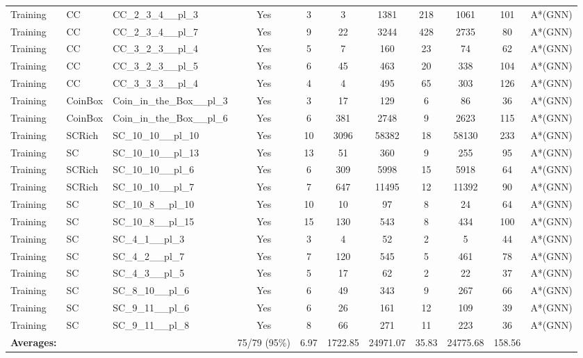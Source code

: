 \documentclass{article}
\begin{document}
\begin{tabular}{lllcccccccc}
Training & CC & CC\_2\_3\_4\_\_pl\_3 & Yes & 3 & 3 & 1381 & 218 & 1061 & 101 & A*(GNN) \\
Training & CC & CC\_2\_3\_4\_\_pl\_7 & Yes & 9 & 22 & 3244 & 428 & 2735 & 80 & A*(GNN) \\
Training & CC & CC\_3\_2\_3\_\_pl\_4 & Yes & 5 & 7 & 160 & 23 & 74 & 62 & A*(GNN) \\
Training & CC & CC\_3\_2\_3\_\_pl\_5 & Yes & 6 & 45 & 463 & 20 & 338 & 104 & A*(GNN) \\
Training & CC & CC\_3\_3\_3\_\_pl\_4 & Yes & 4 & 4 & 495 & 65 & 303 & 126 & A*(GNN) \\
Training & CoinBox & Coin\_in\_the\_Box\_\_pl\_3 & Yes & 3 & 17 & 129 & 6 & 86 & 36 & A*(GNN) \\
Training & CoinBox & Coin\_in\_the\_Box\_\_pl\_6 & Yes & 6 & 381 & 2748 & 9 & 2623 & 115 & A*(GNN) \\
Training & SCRich & SC\_10\_10\_\_pl\_10 & Yes & 10 & 3096 & 58382 & 18 & 58130 & 233 & A*(GNN) \\
Training & SC & SC\_10\_10\_\_pl\_13 & Yes & 13 & 51 & 360 & 9 & 255 & 95 & A*(GNN) \\
Training & SCRich & SC\_10\_10\_\_pl\_6 & Yes & 6 & 309 & 5998 & 15 & 5918 & 64 & A*(GNN) \\
Training & SCRich & SC\_10\_10\_\_pl\_7 & Yes & 7 & 647 & 11495 & 12 & 11392 & 90 & A*(GNN) \\
Training & SC & SC\_10\_8\_\_pl\_10 & Yes & 10 & 10 & 97 & 8 & 24 & 64 & A*(GNN) \\
Training & SC & SC\_10\_8\_\_pl\_15 & Yes & 15 & 130 & 543 & 8 & 434 & 100 & A*(GNN) \\
Training & SC & SC\_4\_1\_\_pl\_3 & Yes & 3 & 4 & 52 & 2 & 5 & 44 & A*(GNN) \\
Training & SC & SC\_4\_2\_\_pl\_7 & Yes & 7 & 120 & 545 & 5 & 461 & 78 & A*(GNN) \\
Training & SC & SC\_4\_3\_\_pl\_5 & Yes & 5 & 17 & 62 & 2 & 22 & 37 & A*(GNN) \\
Training & SC & SC\_8\_10\_\_pl\_6 & Yes & 6 & 49 & 343 & 9 & 267 & 66 & A*(GNN) \\
Training & SC & SC\_9\_11\_\_pl\_6 & Yes & 6 & 26 & 161 & 12 & 109 & 39 & A*(GNN) \\
Training & SC & SC\_9\_11\_\_pl\_8 & Yes & 8 & 66 & 271 & 11 & 223 & 36 & A*(GNN) \\
\textbf{Averages:} & & & 75/79 (95\%) & 6.97 & 1722.85 & 24971.07 & 35.83 & 24775.68 & 158.56 & \\
\bottomrule
\end{tabular}
\newpage
\end{document}
